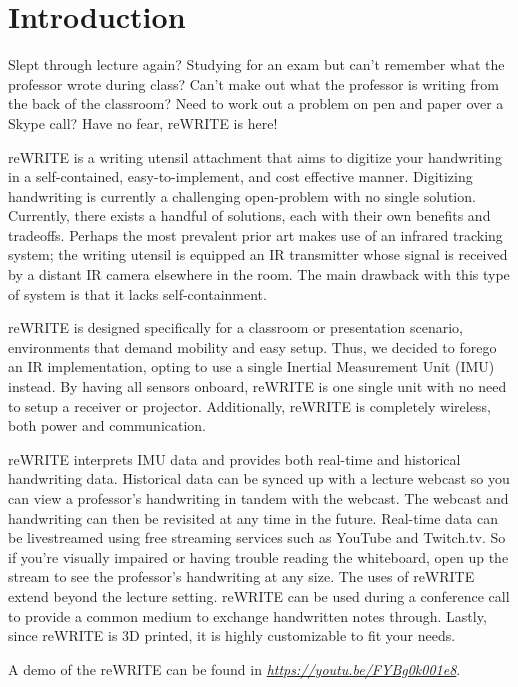 \documentclass[10pt,journal]{IEEEtran}
\begin{document}
\section{Introduction}
\par Slept through lecture again? Studying for an exam but can’t remember what the professor wrote during class? Can’t make out what the professor is writing from the back of the classroom? Need to work out a problem on pen and paper over a Skype call? Have no fear, reWRITE is here!
\par reWRITE is a writing utensil attachment that aims to digitize your handwriting in a self-contained, easy-to-implement, and cost effective manner. Digitizing handwriting is currently a challenging open-problem with no single solution. Currently, there exists a handful of solutions, each with their own benefits and tradeoffs. Perhaps the most prevalent prior art makes use of an infrared tracking system; the writing utensil is equipped an IR transmitter whose signal is received by a distant IR camera elsewhere in the room. The main drawback with this type of system is that it lacks self-containment.
\par reWRITE is designed specifically for a classroom or presentation scenario, environments that demand mobility and easy setup. Thus, we decided to forego an IR implementation, opting to use a single Inertial Measurement Unit (IMU) instead. By having all sensors onboard, reWRITE is one single unit with no need to setup a receiver or projector. Additionally, reWRITE is completely wireless, both power and communication.
\par reWRITE interprets IMU data and provides both real-time and historical handwriting data. Historical data can be synced up with a lecture webcast so you can view a professor’s handwriting in tandem with the webcast. The webcast and handwriting can then be revisited at any time in the future. Real-time data can be livestreamed using free streaming services such as YouTube and Twitch.tv. So if you’re visually impaired or having trouble reading the whiteboard, open up the stream to see the professor’s handwriting at any size. The uses of reWRITE extend beyond the lecture setting. reWRITE can be used during a conference call to provide a common medium to exchange handwritten notes through. Lastly, since reWRITE is 3D printed, it is highly customizable to fit your needs.
\par A demo of the reWRITE can be found in \textit{\url{https://youtu.be/FYBg0k001e8}}.
\end{document}
